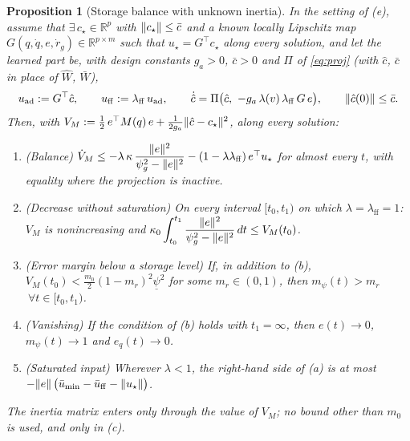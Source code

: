 \documentclass[11pt]{article}\usepackage[margin=1in]{geometry}\usepackage{amsmath,amssymb,amsthm,mathtools}\usepackage{graphicx}\graphicspath{{figures/}{../figures/}{figs/}{./}}\usepackage{enumitem}\usepackage{hyperref}\usepackage{cleveref}\usepackage{tikz}\usetikzlibrary{arrows.meta,positioning,calc,shapes.geometric}\usepackage{float}\usepackage[most]{tcolorbox}\usepackage{kotex}\usepackage{booktabs}\emergencystretch=1.6em\tolerance=2000 \crefname{assumption}{Assumption}{Assumptions}\Crefname{assumption}{Assumption}{Assumptions}\crefname{definition}{Definition}{Definitions}\Crefname{definition}{Definition}{Definitions}\crefname{proposition}{Proposition}{Propositions}\Crefname{proposition}{Proposition}{Propositions}\crefname{fact}{Fact}{Facts}\Crefname{fact}{Fact}{Facts} \newtheorem{assumption}{Assumption}\newtheorem{definition}{Definition}\newtheorem{lemma}{Lemma}\newtheorem{proposition}{Proposition}\newtheorem{theorem}{Theorem}\newtheorem{corollary}{Corollary}\newtheorem{fact}{Fact}\theoremstyle{remark}\newtheorem{remark}{Remark} \newcommand{\R}{\mathbb{R}}\newcommand{\U}{\mathcal U}
\begin{document}
\begin{proposition}[Storage balance with unknown inertia]
\label{prop:mechstorage}
In the setting of (e), assume that $\exists\,c_\star\in\R^p$ with $\lVert c_\star\rVert\le\bar c$ and a known locally Lipschitz map $G(q,\dot q,e,\dot r_g)\in\R^{p\times m}$ such that $u_\star=G^\top c_\star$ along every solution, and let the learned part be, with design constants $g_a>0$, $\bar c>0$ and $\Pi$ of \eqref{eq:proj} (with $\hat c$, $\bar c$ in place of $\hat W$, $\bar W$),
\begin{equation}
u_{\mathrm{ad}}:=G^\top\hat c,\qquad u_{\mathrm{ff}}:=\lambda_{\mathrm{ff}}\,u_{\mathrm{ad}},\qquad \dot{\hat c}=\Pi\big(\hat c,\ -g_a\,\lambda(v)\,\lambda_{\mathrm{ff}}\,G\,e\big),\qquad \norm{\hat c(0)}\le\bar c .
\label{eq:chat}
\end{equation}
Then, with $V_M:=\tfrac12\,e^\top M(q)\,e+\tfrac{1}{2g_a}\lVert \hat c-c_\star\rVert^2$, along every solution:
\begin{enumerate}[label=(\alph*)]
\item (Balance) $\dot V_M\le-\lambda\,\kappa\,\dfrac{\lVert e\rVert^2}{\psi_g^2-\lVert e\rVert^2}-(1-\lambda\lambda_{\mathrm{ff}})\,e^\top u_\star$ for almost every $t$, with equality where the projection is inactive.
\item (Decrease without saturation) On every interval $[t_0,t_1)$ on which $\lambda=\lambda_{\mathrm{ff}}=1$: $V_M$ is nonincreasing and $\kappa_0\displaystyle\int_{t_0}^{t_1}\frac{\lVert e\rVert^2}{\psi_g^2-\lVert e\rVert^2}\,dt\le V_M(t_0)$.
\item (Error margin below a storage level) If, in addition to (b), $V_M(t_0)<\tfrac{m_0}{2}(1-m_r)^2\underline\psi^2$ for some $m_r\in(0,1)$, then $m_\psi(t)>m_r$ $\ \forall t\in[t_0,t_1)$.
\item (Vanishing) If the condition of (b) holds with $t_1=\infty$, then $e(t)\to0$, $m_\psi(t)\to1$ and $e_q(t)\to0$.
\item (Saturated input) Wherever $\lambda<1$, the right-hand side of (a) is at most $-\lVert e\rVert\,\big(\bar u_{\min}-\bar u_{\mathrm{ff}}-\lVert u_\star\rVert\big)$.
\end{enumerate}
The inertia matrix enters only through the value of $V_M$; no bound other than $m_0$ is used, and only in (c).
\end{proposition}
\end{document}
